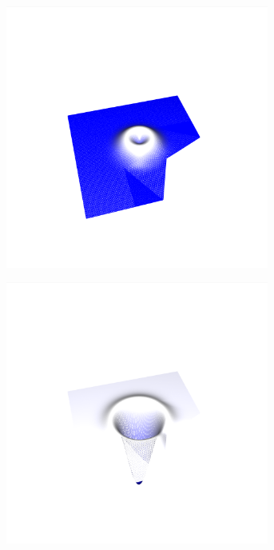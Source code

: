 \documentclass[crop=false,10pt,ngerman]{standalone}
\begin{document}
\begin{figure}[h]
\begin{subfigure}[b]{0.24\textwidth}
          \includegraphics[trim={4cm 1.2cm 4.5cm 1.5cm},clip,width=0.95\textwidth]{images/test_wave_1.png}
          \caption{}
        \end{subfigure}
        \begin{subfigure}[b]{0.24\textwidth}
          \center
          \includegraphics[trim={4cm 1.2cm 4.5cm 1.5cm},clip,width=0.95\textwidth]{images/test_wave_2.png}

\end{subfigure}
\end{figure}
\end{document}
